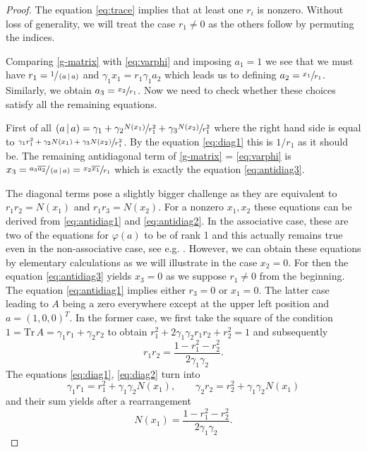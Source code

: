 \begin{proof}
The equation \eqref{eq:trace} implies that at least one $r_i$ is nonzero. Without loss of generality, we will treat the case $r_1 \neq 0$ as the others follow by permuting the indices.

Comparing \eqref{g-matrix} with \eqref{eq:varphi} and imposing $a_1 = 1$ we see that we must have $r_1 =  \sfrac{1}{\left( a \,|\, a \right)}$ and $\gamma_1 x_1 = r_1 \gamma_1 a_2$ which leads us to defining $a_2 = \sfrac{x_1}{r_1}$. Similarly, we obtain $a_3 = \sfrac{x_2}{r_1}$. Now we need to check whether these choices satisfy all the remaining equations.

First of all $\left( a \,|\, a \right) = \gamma_1 + \gamma_2 \sfrac{N(x_1)}{r_1^2} + \gamma_3\sfrac{N(x_2)}{r_1^2}$ where the right hand side is equal to $\sfrac{ \gamma_1 r_1^2+ \gamma_2N(x_1) + \gamma_3N(x_2)}{r_1^2}$. By the equation \eqref{eq:diag1} this is $1/r_1$ as it should be. The remaining antidiagonal term of \eqref{g-matrix} = \eqref{eq:varphi} is $x_3 = \sfrac{a_3\overline{a_2}}{\left( a \,|\, a \right)}  = \sfrac{ x_2\overline{x_1}}{r_1}$ which is exactly the equation \eqref{eq:antidiag3}.

The diagonal terms pose a slightly bigger challenge as they are equivalent to $r_1 r_2  = N(x_1)$ and $r_1 r_3 = N(x_2)$. For a nonzero $x_1, x_2$ these equations can be derived from \eqref{eq:antidiag1} and \eqref{eq:antidiag2}. In the associative case, these are two of the equations for $\varphi(a)$ to be of rank 1 and this actually remains true even in the non-associative case, see e.g. \cite{chaput}. However, we can obtain these equations by elementary calculations  as we will illustrate in the case $x_2 = 0$. For then the equation \eqref{eq:antidiag3} yields $x_3 = 0$ as we suppose $r_1 \neq 0$ from the beginning. The equation \eqref{eq:antidiag1} implies either $r_3 = 0$ or $x_1 = 0$. The latter case leading to $A$ being a zero everywhere except at the upper left position and $a = (1,0,0)^T$. In the former case, we first take the square of the  condition $1 = \mathrm{Tr}\, A = \gamma_1 r_1 + \gamma_2 r_2$ to obtain $r_1^2 + 2\gamma_1\gamma_2 r_1 r_2 + r_2^2 = 1$ and subsequently 
\[
r_1r_2 = \frac{1-r_1^2 - r_2^2}{2\gamma_1\gamma_2}.
\]
The equations \eqref{eq:diag1}, \eqref{eq:diag2} turn into 
\[
\gamma_1 r_1 = r_1^2 +  \gamma_1\gamma_2N(x_1), \qquad \gamma_2 r_2 = r_2^2 + \gamma_1\gamma_2 N(x_1)
\]
and their sum yields after a rearrangement 
\[
N(x_1) = \frac{1- r_1^2 - r_2^2}{2\gamma_1\gamma_2}.
\]
\end{proof}

